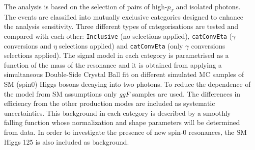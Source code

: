 \documentclass[a4paper, oneside, 11pt, openright]{book}
\begin{document}
		
		
		The analysis is based on the selection of pairs of high-$p_T$ and isolated photons. The events are classified into mutually exclusive categories designed to enhance the analysis sensitivity. Three different types of categorisations are tested and compared with each other: \texttt{Inclusive} (no selections applied), \texttt{catConvEta} ($\gamma$ conversions and $\eta$  selections applied) and \texttt{catConvEta} (only $\gamma$ conversions selections applied). The signal model in each category is parametrised as a function of the mass of the resonance and it is obtained from applying a simultaneous Double-Side Crystal Ball fit on different simulated MC samples of SM (spin0) Higgs bosons decaying into two photons. To reduce the dependence of the model from SM assumptions only \textit{ggF} samples are used. The differences in efficiency from the other production modes are included as systematic uncertainties. This background in each category is described by a smoothly falling function whose normalization and shape parameters will be determined from data. In order to investigate the presence of new spin-0 resonances, the SM Higgs 125 is also included as background. 
		
\end{document}

